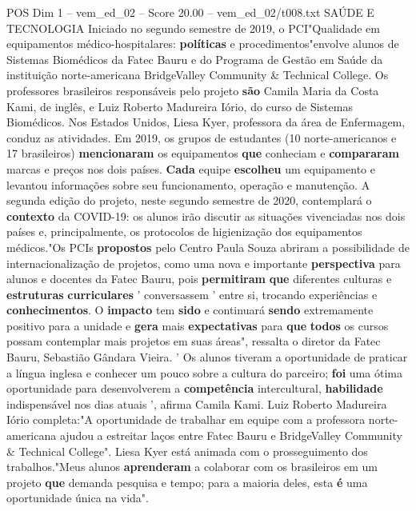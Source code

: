 \begin{textsample}{POS Dim 1 – vem\_ed\_02 – Score 20.00 – vem\_ed\_02/t008.txt}  \label{ex:f1_pos_161}
SAÚDE E TECNOLOGIA Iniciado no segundo semestre de 2019, o PCI"Qualidade em equipamentos médico-hospitalares: \textbf{políticas} e procedimentos"envolve alunos de Sistemas Biomédicos da Fatec Bauru e do Programa de Gestão em Saúde da instituição norte-americana BridgeValley Community \& Technical College.
Os professores brasileiros responsáveis pelo projeto \textbf{são} Camila Maria da Costa Kami, de inglês, e Luiz Roberto Madureira Iório, do curso de Sistemas Biomédicos.
Nos Estados Unidos, Liesa Kyer, professora da área de Enfermagem, conduz as atividades.
Em 2019, os grupos de estudantes (10 norte-americanos e 17 brasileiros) \textbf{mencionaram} os equipamentos \textbf{que} conheciam e \textbf{compararam} marcas e preços nos dois países. \textbf{Cada} equipe \textbf{escolheu} um equipamento e levantou informações sobre seu funcionamento, operação e manutenção.
A segunda edição do projeto, neste segundo semestre de 2020, contemplará o \textbf{contexto} da COVID-19: os alunos irão discutir as situações vivenciadas nos dois países e, principalmente, os protocolos de higienização dos equipamentos médicos."Os PCIs \textbf{propostos} pelo Centro Paula Souza abriram a possibilidade de internacionalização de projetos, como uma nova e importante \textbf{perspectiva} para alunos e docentes da Fatec Bauru, pois \textbf{permitiram} \textbf{que} diferentes culturas e \textbf{estruturas} \textbf{curriculares} ' conversassem ' entre si, trocando experiências e \textbf{conhecimentos}.
O \textbf{impacto} tem \textbf{sido} e continuará \textbf{sendo} extremamente positivo para a unidade e \textbf{gera} mais \textbf{expectativas} para \textbf{que} \textbf{todos} os cursos possam contemplar mais projetos em suas áreas", ressalta o diretor da Fatec Bauru, Sebastião Gândara Vieira. ' Os alunos tiveram a oportunidade de praticar a língua inglesa e conhecer um pouco sobre a cultura do parceiro; \textbf{foi} uma ótima oportunidade para desenvolverem a \textbf{competência} intercultural, \textbf{habilidade} indispensável nos dias atuais ', afirma Camila Kami.
Luiz Roberto Madureira Iório completa:"A oportunidade de trabalhar em equipe com a professora norte-americana ajudou a estreitar laços entre Fatec Bauru e BridgeValley Community \& Technical College".
Liesa Kyer está animada com o prosseguimento dos trabalhos."Meus alunos \textbf{aprenderam} a colaborar com os brasileiros em um projeto \textbf{que} demanda pesquisa e tempo; para a maioria deles, esta \textbf{é} uma oportunidade única na vida".

\end{textsample}
